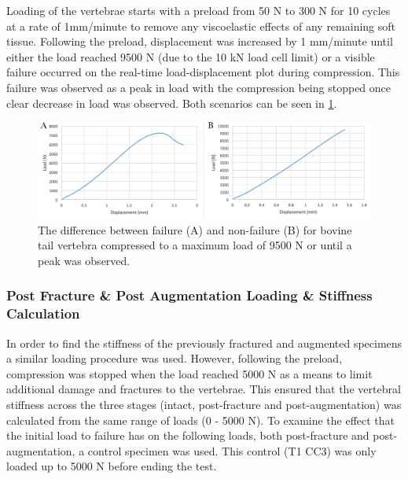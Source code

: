 Loading of the vertebrae starts with a preload from 50 N to 300 N for 10 cycles
at a rate of 1mm/minute to remove any viscoelastic effects of any remaining
soft tissue. Following the preload, displacement was increased by 1 mm/minute
until either the load reached 9500 N (due to the 10 kN load cell limit) or a
visible failure occurred on the real-time load-displacement plot during
compression.  This failure was observed as a peak in load with the compression
being stopped once clear decrease in load was observed. Both scenarios can be
seen in \cref{fig:failure_non_failure}.



\begin{figure}[ht!]
\centering
\includegraphics[width=16cm]{images/comparing_failureand_nonfailure.png}
\caption{The difference between failure (A) and non-failure (B) for bovine tail vertebra compressed to a maximum load of 9500 N or until a peak was observed.}
\label{fig:failure_non_failure}
\end{figure}

\subsubsection{Post Fracture \& Post Augmentation Loading \& Stiffness
Calculation}\label{post-fracture-post-vertebroplasty}

In order to find the stiffness of the previously fractured and augmented
specimens a similar loading procedure was used. However, following the preload,
compression was stopped when the load reached 5000 N as a means to limit
additional damage and fractures to the vertebrae. This ensured that the
vertebral stiffness across the three stages (intact, post-fracture and
post-augmentation) was calculated from the same range of loads (0 - 5000 N). To
examine the effect that the initial load to failure has on the following loads,
both post-fracture and post-augmentation, a control specimen was used. This
control (T1 CC3) was only loaded up to 5000 N before ending the test.




